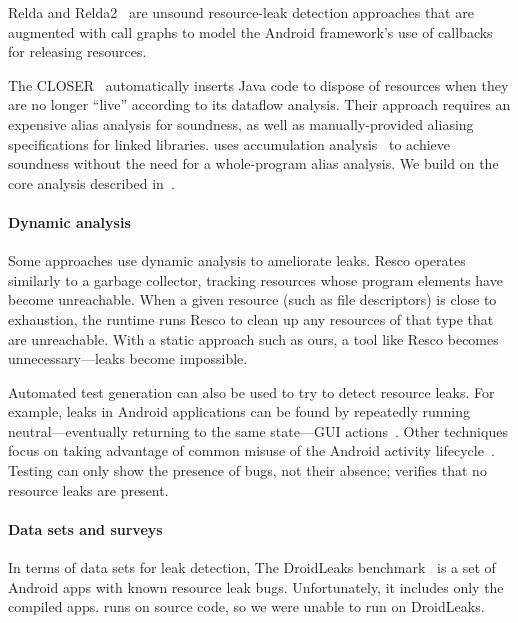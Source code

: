 Relda and Relda2~\cite{guo2013characterizing,wu2016relda2} are unsound
resource-leak detection approaches  that are
augmented with call graphs to model the Android framework's use of callbacks for
releasing resources.

The CLOSER~\cite{dillig2008closer} automatically inserts Java code to dispose of
resources when they are no longer ``live'' according to its dataflow analysis.
Their approach requires an expensive alias analysis for soundness, as well as
manually-provided aliasing specifications for linked libraries.
\Tool uses accumulation
analysis~\cite{KelloggRSSE2020,FahndrichLeino03} to achieve soundness without
the need
for a whole-program alias analysis.
We
build on the core analysis described in~\cite{KelloggRSSE2020}.

\paragraph{Dynamic analysis}
Some approaches use dynamic analysis to ameliorate leaks.  Resco \cite{dai2013resco}
operates similarly to a garbage collector, tracking resources whose program
elements have become unreachable. When a given resource (such as file
descriptors) is close to exhaustion, the runtime runs Resco to clean up any
resources of that type that are unreachable.  With a static approach such as
ours, a tool like Resco becomes unnecessary---leaks become impossible.

Automated test generation can also be used to try to detect resource
leaks. For example, leaks in Android applications can be found by
repeatedly running neutral---eventually returning to the same
state---GUI actions~\cite{wu2018sentinel,zhang2016automated}.
Other techniques focus on taking advantage of common misuse of
the Android activity lifecycle~\cite{amalfitano2020memories}.
Testing can only show the presence of bugs, not their absence;
\Tool verifies that no resource leaks are present.

\paragraph{Data sets and surveys}
In terms of data sets for leak detection, The DroidLeaks
benchmark~\cite{liu2019droidleaks} is a set of Android apps with known resource
leak bugs. Unfortunately, it includes only the compiled apps.
\Tool runs on source code, so we were unable to run \Tool on DroidLeaks.

